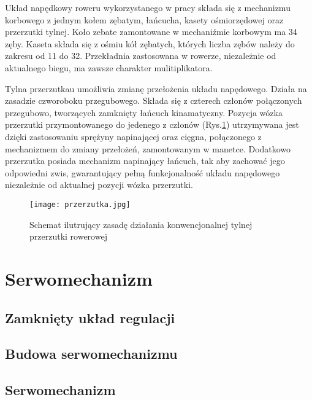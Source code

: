 Układ napędkowy roweru wykorzystanego w pracy składa się z mechanizmu korbowego z jednym kołem zębatym, łańcucha, kasety ośmiorzędowej oraz przerzutki tylnej. Koło zebate zamontowane w mechaniźmie korbowym ma 34 zęby. Kaseta składa się z ośmiu kół zębatych, których liczba zębów należy do zakresu od 11 do 32. Przekładnia zastosowana w rowerze, niezależnie od aktualnego biegu, ma zawsze charakter mulitiplikatora.

Tylna przerzutkau umożliwia zmianę przełożenia układu napędowego. Działa na zasadzie czworoboku przegubowego. Składa się z czterech członów połączonych przegubowo, tworzących zamknięty łańcuch kinamatyczny. Pozycja wózka przerzutki przymontowanego do jedenego z członów (Rys.\ref{fig:przerzutka}) utrzymywana jest dzięki zastosowaniu sprężyny napinającej oraz cięgna, połączonego z mechanizmem do zmiany przełożeń, zamontowanym w manetce. Dodatkowo przerzutka posiada mechanizm napinający łańcuch, tak aby zachować jego odpowiedni zwis, gwarantujący pełną funkcjonalność układu napędowego niezależnie od aktualnej pozycji wózka przerzutki. 
\begin{figure}[h]
    \centering
    \texttt{[image: przerzutka.jpg]}
    \caption{Schemat ilutrujący zasadę działania konwencjonalnej tylnej przerzutki rowerowej}
    \label{fig:przerzutka}
\end{figure}

\section{Serwomechanizm}
\subsection{Zamknięty układ regulacji}
\subsection{Budowa serwomechanizmu}

\subsection{Serwomechanizm}
